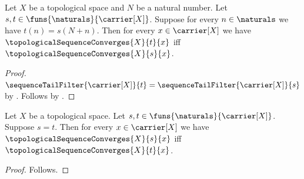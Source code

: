 \begin{theorem}\label{finite_shift_topological_sequence_convergence_iff}
    Let $X$ be a topological space and $N$ be a natural number.
    Let $s,t\in\funs{\naturals}{\carrier[X]}$.
    Suppose for every $n\in\naturals$ we have $t(n)=s(N+n)$.
    Then for every $x\in\carrier[X]$ we have
        $\topologicalSequenceConverges{X}{t}{x}$ iff
        $\topologicalSequenceConverges{X}{s}{x}$.
\end{theorem}
\begin{proof}
    $\sequenceTailFilter{\carrier[X]}{t}
        =\sequenceTailFilter{\carrier[X]}{s}$
        by .
    Follows by .
\end{proof}

\begin{corollary}\label{equal_sequences_topological_convergence_iff}
    Let $X$ be a topological space.
    Let $s,t\in\funs{\naturals}{\carrier[X]}$.
    Suppose $s=t$.
    Then for every $x\in\carrier[X]$ we have
        $\topologicalSequenceConverges{X}{s}{x}$ iff
        $\topologicalSequenceConverges{X}{t}{x}$.
\end{corollary}
\begin{proof}
    Follows.
\end{proof}
